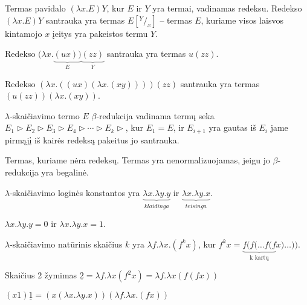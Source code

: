 \begin{defn}
  Termas pavidalo $(\lambda x.E)Y$, kur $E$ ir $Y$ yra termai, vadinamas
  redeksu. Redekso $(\lambda x.E)Y$ santrauka yra termas $E[^Y/_x]$
  – termas $E$, kuriame visos laisvos kintamojo $x$ įeitys yra pakeistos
  termu $Y$.
  \begin{exmp}
    Redekso $(\lambda x.\underbrace{(ux))}_{E}\underbrace{(zz)}_{Y}$
    santrauka yra termas $u(zz)$.
  \end{exmp}
  \begin{exmp}
    Redekso $(\lambda x.((ux)(\lambda x.(xy))))(zz)$ santrauka yra 
    termas $(u(zz))(\lambda x.(xy))$.
  \end{exmp}
\end{defn}

\begin{defn}
  $\lambda$-skaičiavimo termo $E$ $\beta$-redukcija vadinama termų seka
  $E_1 \triangleright E_2 \triangleright E_3 \triangleright %
  E_4 \triangleright \cdots \triangleright E_k \triangleright$, kur
  $E_1 = E$, ir $E_{i+1}$ yra gautas iš $E_{i}$ jame pirmąjį iš kairės 
  redeksą pakeitus jo santrauka.
\end{defn}

\begin{defn}
  Termas, kuriame nėra redeksų. Termas yra nenormalizuojamas, jeigu jo 
  $\beta$-redukcija yra begalinė.
\end{defn}

\begin{defn}
  $\lambda$-skaičiavimo loginės konstantos yra 
  $\underbrace{\lambda x.\lambda y.y}_{klaidinga}$ ir 
  $\underbrace{\lambda x.\lambda y.x}_{teisinga}$.
  \begin{notation}
    $\lambda x.\lambda y.y = 0$ ir $\lambda x.\lambda y.x = 1$.
  \end{notation}
\end{defn}

\begin{defn}
  $\lambda$-skaičiavimo natūrinis skaičius $k$ yra 
  $\lambda f.\lambda x.(f^{k} x)$, kur
  $f^{k} x = \underbrace{f(f(\dots f(f}_{\text{k kartų}} x )\dots))$.
  \begin{notation}
    Skaičius 2 žymimas 
    $\underline{2} = \lambda f.\lambda x(f^{2} x) =%
    \lambda f.\lambda x(f(fx))$
  \end{notation}
\end{defn}

\begin{exmp}
  $(x1)\underline{1} = (x(\lambda x.\lambda y.x))(\lambda f.\lambda x.(fx))$
\end{exmp}

